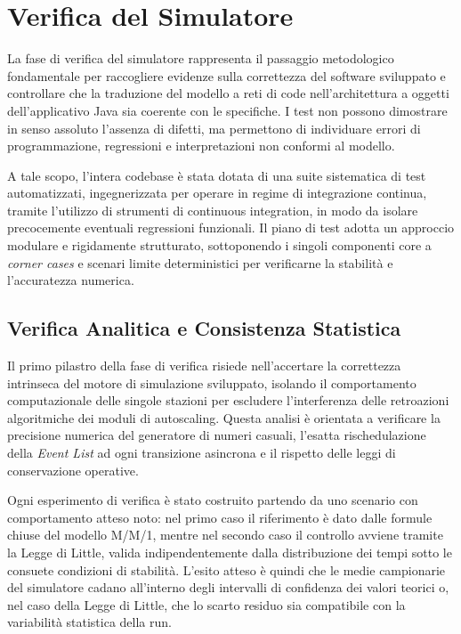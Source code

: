 ﻿\documentclass[a4paper,12pt]{article}
\begin{document}
\clearpage


\section{Verifica del Simulatore}
La fase di verifica del simulatore rappresenta il passaggio metodologico fondamentale per raccogliere evidenze sulla correttezza del software sviluppato e controllare che la traduzione del modello a reti di code nell'architettura a oggetti dell'applicativo Java sia coerente con le specifiche. I test non possono dimostrare in senso assoluto l'assenza di difetti, ma permettono di individuare errori di programmazione, regressioni e interpretazioni non conformi al modello.

A tale scopo, l'intera codebase è stata dotata di una suite sistematica di test automatizzati, ingegnerizzata per operare in regime di integrazione continua, tramite l'utilizzo di strumenti di continuous integration, in modo da isolare precocemente eventuali regressioni funzionali. Il piano di test adotta un approccio modulare e rigidamente strutturato, sottoponendo i singoli componenti core a \textit{corner cases} e scenari limite deterministici per verificarne la stabilità e l'accuratezza numerica. 


\subsection{Verifica Analitica e Consistenza Statistica}
Il primo pilastro della fase di verifica risiede nell'accertare la correttezza intrinseca del motore di simulazione sviluppato, isolando il comportamento computazionale delle singole stazioni per escludere l'interferenza delle retroazioni algoritmiche dei moduli di autoscaling. Questa analisi è orientata a verificare la precisione numerica del generatore di numeri casuali, l'esatta rischedulazione della \textit{Event List} ad ogni transizione asincrona e il rispetto delle leggi di conservazione operative.

Ogni esperimento di verifica è stato costruito partendo da uno scenario con comportamento atteso noto: nel primo caso il riferimento è dato dalle formule chiuse del modello M/M/1, mentre nel secondo caso il controllo avviene tramite la Legge di Little, valida indipendentemente dalla distribuzione dei tempi sotto le consuete condizioni di stabilità. L'esito atteso è quindi che le medie campionarie del simulatore cadano all'interno degli intervalli di confidenza dei valori teorici o, nel caso della Legge di Little, che lo scarto residuo sia compatibile con la variabilità statistica della run.
\end{document}
